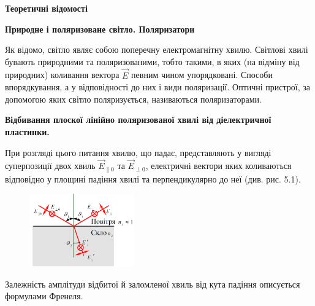 \documentclass[12pt,a4paper]{article}
\begin{document}
    \begin{center} \textbf{\large Теоретичні відомості} \end{center}
    \setlength{\parindent}{1.5em}

    \begin{center} \textbf{Природне і поляризоване світло. Поляризатори} \end{center}

    Як відомо, світло являє собою поперечну електромагнітну хвилю. Світлові хвилі
    бувають природними та поляризованими, тобто такими, в яких (на відміну від
    природних) коливання вектора $\vec{E}$ певним чином упорядковані. Способи
    впорядкування, а у відповідності до них і види поляризації. Оптичні пристрої, за
    допомогою яких світло поляризується, називаються поляризаторами.

    \begin{center} \textbf{Відбивання плоскої лінійно поляризованої хвилі від діелектричної пластинки.} \end{center}

    При розгляді цього питання хвилю, що падає, представляють у вигляді
    суперпозиції двох хвиль \(\vec{E}_{\parallel 0}\) та \(\vec{E}_{\perp 0}\), електричні вектори яких коливаються відповідно у
    площині падіння хвилі та перпендикулярно до неї (див. рис. 5.1).

    \begin{figure}[!ht]

        \renewcommand{\thefigure}{5.\arabic{figure}} %

        \centering
        \includegraphics[width=0.4\textwidth]{5.1.png}
        \caption{}
        \label{fig1:schema}

    \end{figure}

    Залежність амплітуди
    відбитої й заломленої хвиль від кута падіння описується формулами Френеля.
\end{document}
